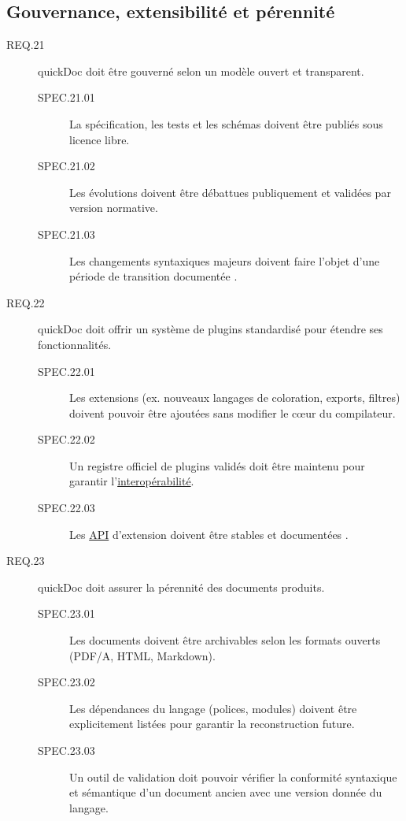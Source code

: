 \documentclass[a4paper,12pt]{article}
\begin{document}
\subsection{Gouvernance, extensibilité et pérennité}
\label{sec:orgdacbb46}
\begin{description}
\item[{\label{org619b7f8}REQ.21}] quickDoc doit être gouverné selon un modèle ouvert et transparent.
\begin{description}
\item[{\label{org61665de}SPEC.21.01}] La spécification, les tests et les schémas doivent être publiés sous licence libre.
\item[{\label{org201a65b}SPEC.21.02}] Les évolutions doivent être débattues publiquement et validées par version normative.
\item[{\label{org8d17a0b}SPEC.21.03}] Les changements syntaxiques majeurs doivent faire l’objet d’une période de transition documentée \autocite{EclipseProjectsAsciiDoc2025}.
\end{description}

\item[{\label{org12cf698}REQ.22}] quickDoc doit offrir un système de plugins standardisé pour étendre ses fonctionnalités.
\begin{description}
\item[{\label{org2d4d28a}SPEC.22.01}] Les extensions (ex. nouveaux langages de coloration, exports, filtres) doivent pouvoir être ajoutées sans modifier le cœur du compilateur.
\item[{\label{orgfdf95a1}SPEC.22.02}] Un registre officiel de plugins validés doit être maintenu pour garantir l’\protect\hyperlink{gls-1}{\label{gls-1-use-4}interopérabilité}.
\item[{\label{orgb33e5d7}SPEC.22.03}] Les \protect\hyperlink{gls-5}{\label{gls-5-use-2}API} d’extension doivent être stables et documentées \autocite{GithubSpeckit2025,EclipseProjectsAsciiDoc2025}.
\end{description}

\item[{\label{org7a7f429}REQ.23}] quickDoc doit assurer la pérennité des documents produits.
\begin{description}
\item[{\label{orgbdfc034}SPEC.23.01}] Les documents doivent être archivables selon les formats ouverts (PDF/A, HTML, Markdown).
\item[{\label{org0d4cc45}SPEC.23.02}] Les dépendances du langage (polices, modules) doivent être explicitement listées pour garantir la reconstruction future.
\item[{\label{org4a66554}SPEC.23.03}] Un outil de validation doit pouvoir vérifier la conformité syntaxique et sémantique d’un document ancien avec une version donnée du langage.
\end{description}
\end{description}
\end{document}
